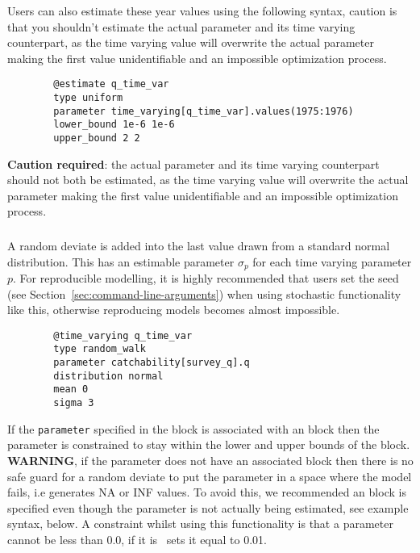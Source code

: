 Users can also estimate these year values using the following syntax, caution is that you shouldn't estimate the actual parameter and its time varying counterpart, as the time varying value will overwrite the actual parameter making the first value unidentifiable and an impossible optimization process.
{\small{\begin{verbatim}
		@estimate q_time_var
		type uniform
		parameter time_varying[q_time_var].values(1975:1976)
		lower_bound 1e-6 1e-6
		upper_bound 2 2
		\end{verbatim}}}
	
\textbf{Caution required}: the actual parameter and its time varying counterpart should not both be estimated, as the time varying value will overwrite the actual parameter making the first value unidentifiable and an impossible optimization process.

\subsubsection[Random Walk]{}

A random deviate is added into the last value drawn from a standard normal distribution. This has an estimable parameter $\sigma_p$ for each time varying parameter $p$. For reproducible modelling, it is highly recommended that users set the seed (see Section~\ref{sec:command-line-arguments}) when using stochastic functionality like this, otherwise reproducing models becomes almost impossible.
{\small{\begin{verbatim}
		@time_varying q_time_var
		type random_walk
		parameter catchability[survey_q].q
		distribution normal
		mean 0
		sigma 3
		\end{verbatim}}}

If the \texttt{parameter} specified in the  block is associated with an  block then the parameter is constrained to stay within the lower and upper bounds of the  block. \textbf{WARNING}, if the parameter does not have an associated  block then there is no safe guard for a random deviate to put the parameter in a space where the model fails, i.e generates NA or INF values. To avoid this, we recommended an  block is specified even though the parameter is not actually being estimated, see example syntax, below. A constraint whilst using this functionality is that a parameter cannot be less than 0.0, if it is \CNAME\ sets it equal to 0.01.

